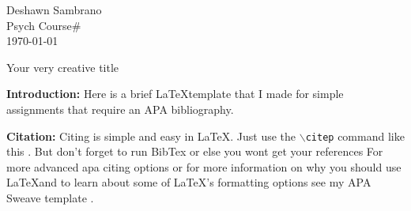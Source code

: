 \documentclass[12pt]{article} %
\newcommand{\code}[1]{\colorbox{light-gray}{\texttt{#1}}} %
\begin{document}
 \begin{flushright}
	 Deshawn Sambrano\textbf{\\}
	 Psych Course\# \\
	 \today
 \end{flushright}
 
 \begin{center}
	 Your very creative title
 \end{center}
 \par\textbf{Introduction:} Here is a brief \LaTeX template that I made for simple assignments that require an APA bibliography. 
 
  
  \textbf{Citation:} Citing is simple and easy in \LaTeX. Just use the \code{$\backslash$citep} command like this \citep[e.g.,][]{Balcetis2006, Mijovic2010}. But don't forget to run BibTex or else you wont get your references For more advanced apa citing options or for more information on why you should use \LaTeX and to learn about some of \LaTeX's formatting options see my APA Sweave template \citep[also see the apacite \LaTeX package for citation information]{template}.
\bibnewpage

\doublespacing
\setlength\bibhang{.5in}
  


  
  
\end{document}
